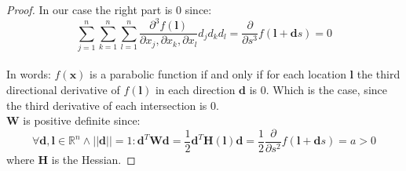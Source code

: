 \begin{proof}
\noindent
In our case the right part is 0 since:
	\begin{equation}
\sum\limits_{j=1}^{n}\sum\limits_{k=1}^{n}\sum\limits_{l=1}^{n} \frac{\partial^3 f(\mathbf{l}) }{\partial x_j,\partial x_k,\partial x_l}d_{j}d_{k}d_{l}= \frac{\partial}{\partial s^3}f(\mathbf{l}+\mathbf{d}s)=0
	\end{equation}
\\	
 In words: $f(\mathbf{x})$ is a parabolic function if and only if for each location $\mathbf{l}$ the third directional derivative of $f(\mathbf{\mathbf{l}})$ in each direction $\mathbf{d}$ is $0$. Which is the case, since the third derivative of each intersection is 0.
\\
$\mathbf{W}$ is positive definite since: \\
\begin{equation}
\forall \mathbf{d},\mathbf{l} \in \mathbb{R}^n \land ||\mathbf{d}||=1: \mathbf{d}^T \mathbf{W} \mathbf{d} =\frac{1}{2}\mathbf{d}^T \mathbf{H}(\mathbf{l}) \mathbf{d}= \frac{1}{2} \frac{\partial}{\partial s^2}f(\mathbf{l}+\mathbf{d}s) = a > 0
\end{equation}
where $\mathbf{H}$ is the Hessian.
\end{proof}